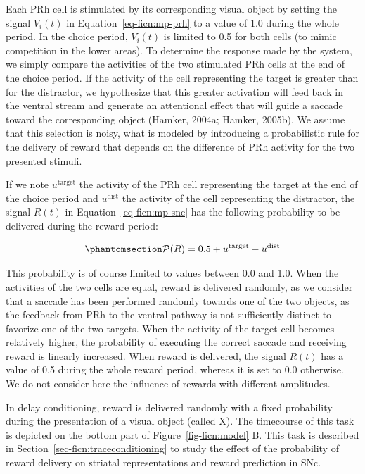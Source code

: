 \documentclass[
  11pt,
  a4paper,
]{scrbook}
\begin{document}
Each PRh cell is stimulated by its corresponding visual object by
setting the signal \(V_i(t)\) in Equation~\ref{eq-ficn:mp-prh} to a
value of 1.0 during the whole period. In the choice period, \(V_i(t)\)
is limited to 0.5 for both cells (to mimic competition in the lower
areas). To determine the response made by the system, we simply compare
the activities of the two stimulated PRh cells at the end of the choice
period. If the activity of the cell representing the target is greater
than for the distractor, we hypothesize that this greater activation
will feed back in the ventral stream and generate an attentional effect
that will guide a saccade toward the corresponding object (Hamker,
2004a; Hamker, 2005b). We assume that this selection is noisy, what is
modeled by introducing a probabilistic rule for the delivery of reward
that depends on the difference of PRh activity for the two presented
stimuli.

If we note \(u^{\text{target}}\) the activity of the PRh cell
representing the target at the end of the choice period and
\(u^{\text{dist}}\) the activity of the cell representing the
distractor, the signal \(R(t)\) in Equation~\ref{eq-ficn:mp-snc} has the
following probability to be delivered during the reward period:

\begin{equation}\phantomsection\label{eq-ficn:reward}{
    \mathcal{P}(R)  =  0.5+ u^{\text{target}} - u^{\text{dist}}
}\end{equation}

This probability is of course limited to values between 0.0 and 1.0.
When the activities of the two cells are equal, reward is delivered
randomly, as we consider that a saccade has been performed randomly
towards one of the two objects, as the feedback from PRh to the ventral
pathway is not sufficiently distinct to favorize one of the two targets.
When the activity of the target cell becomes relatively higher, the
probability of executing the correct saccade and receiving reward is
linearly increased. When reward is delivered, the signal \(R(t)\) has a
value of 0.5 during the whole reward period, whereas it is set to 0.0
otherwise. We do not consider here the influence of rewards with
different amplitudes.

In delay conditioning, reward is delivered randomly with a fixed
probability during the presentation of a visual object (called X). The
timecourse of this task is depicted on the bottom part of
Figure~\ref{fig-ficn:model} B. This task is described in
Section~\ref{sec-ficn:traceconditioning} to study the effect of the
probability of reward delivery on striatal representations and reward
prediction in SNc.
\end{document}
